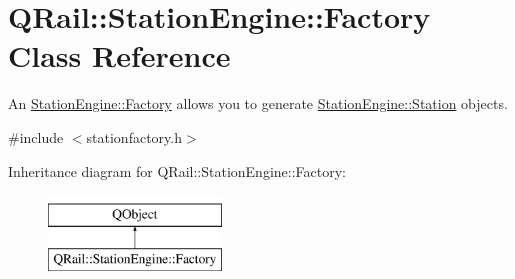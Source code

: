 \hypertarget{classQRail_1_1StationEngine_1_1Factory}{}\section{Q\+Rail\+::Station\+Engine\+::Factory Class Reference}
\label{classQRail_1_1StationEngine_1_1Factory}


An \mbox{\hyperlink{classQRail_1_1StationEngine_1_1Factory}{Station\+Engine\+::\+Factory}} allows you to generate \mbox{\hyperlink{classQRail_1_1StationEngine_1_1Station}{Station\+Engine\+::\+Station}} objects.  




{\ttfamily \#include $<$stationfactory.\+h$>$}

Inheritance diagram for Q\+Rail\+::Station\+Engine\+::Factory\+:\begin{figure}[H]
\begin{center}
\leavevmode
\includegraphics[height=2.000000cm]{classQRail_1_1StationEngine_1_1Factory}
\end{center}
\end{figure}
